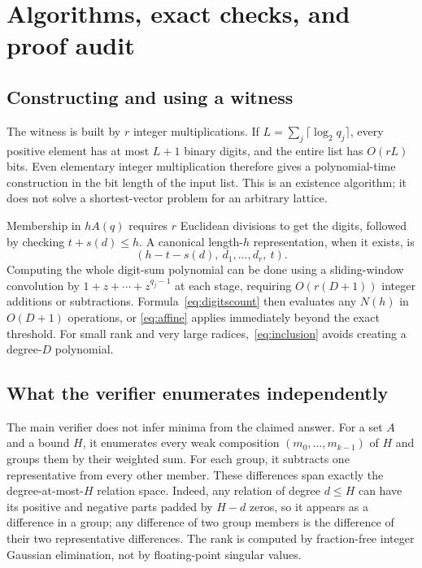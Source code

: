 \documentclass[11pt]{article}
\numberwithin{equation}{section}
\theoremstyle{definition}
\theoremstyle{remark}\newtheorem{remark}[theorem]{Remark}
\begin{document}
\section{Algorithms, exact checks, and proof audit}
\label{sec:verification}

\subsection{Constructing and using a witness}

The witness is built by $r$ integer multiplications.  If
$L=\sum_j\lceil\log_2q_j\rceil$, every positive element has at most
$L+1$ binary digits, and the entire list has $O(rL)$ bits.  Even elementary
integer multiplication therefore gives a polynomial-time construction in
the bit length of the input list.  This is an existence algorithm; it does
not solve a shortest-vector problem for an arbitrary lattice.

Membership in $hA(q)$ requires $r$ Euclidean divisions to get the digits,
followed by checking $t+s(d)\le h$.  A canonical length-$h$ representation,
when it exists, is
\[
 (h-t-s(d),\ d_1,\ldots,d_r,\ t).
\]
Computing the whole digit-sum polynomial can be done using a sliding-window
convolution by $1+z+\cdots+z^{q_j-1}$ at each stage, requiring
$O(r(D+1))$ integer additions or subtractions.  Formula~\eqref{eq:digitscount}
then evaluates any $N(h)$ in $O(D+1)$ operations, or
\eqref{eq:affine} applies immediately beyond the exact threshold.
For small rank and very large radices,~\eqref{eq:inclusion} avoids creating
a degree-$D$ polynomial.

\subsection{What the verifier enumerates independently}

The main verifier does not infer minima from the claimed answer.  For a set
$A$ and a bound $H$, it enumerates every weak composition
$(m_0,\ldots,m_{k-1})$ of $H$ and groups them by their weighted sum.
For each group, it subtracts one representative from every other member.
These differences span exactly the degree-at-most-$H$ relation space.
Indeed, any relation of degree $d\le H$ can have its positive and negative
parts padded by $H-d$ zeros, so it appears as a difference in a group;
any difference of two group members is the difference of their two
representative differences.  The rank is computed by fraction-free integer
Gaussian elimination, not by floating-point singular values.
\end{document}
